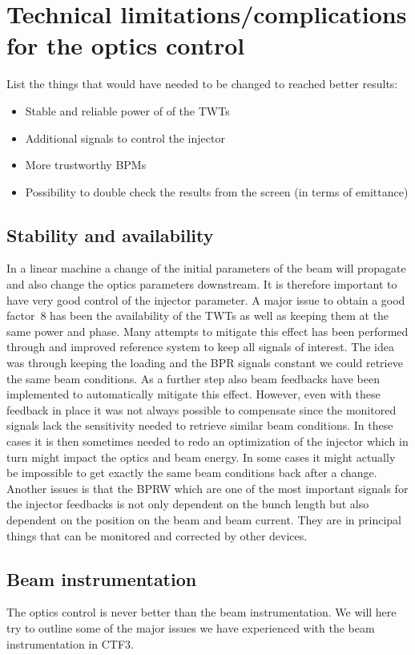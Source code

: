 \section{Technical limitations/complications for the optics control}

List the things that would have needed to be changed to reached better results:

\begin{itemize}
\item Stable and reliable power of of the TWTs
\item Additional signals to control the injector
\item More trustworthy BPMs
\item Possibility to double check the results from the screen (in terms of emittance)
\end{itemize}

\subsection{Stability and availability}
In a linear machine a change of the initial parameters of the beam will propagate and also change the optics parameters downstream. It is therefore important to have very good control of the injector parameter. A major issue to obtain a good factor~8 has been the availability of the TWTs as well as keeping them at the same power and phase. Many attempts to mitigate this effect has been performed through and improved reference system to keep all signals of interest. The idea was through keeping the loading and the BPR signals constant we could retrieve the same beam conditions. As a further step also beam feedbacks have been implemented to automatically mitigate this effect. However, even with these feedback in place it was not always possible to compensate since the monitored signals lack the sensitivity needed to retrieve similar beam conditions. In these cases it is then sometimes needed to redo an optimization of the injector which in turn might impact the optics and beam energy.
In some cases it might actually be impossible to get exactly the same beam conditions back after a change. Another issues is that the BPRW which are one of the most important signals for the injector feedbacks is not only dependent on the bunch length but also dependent on the position on the beam and beam current. They are in principal things that can be monitored and corrected by other devices. 

\subsection{Beam instrumentation}
The optics control is never better than the beam instrumentation. We will here try to outline some of the major issues we have experienced with the beam instrumentation in CTF3.

